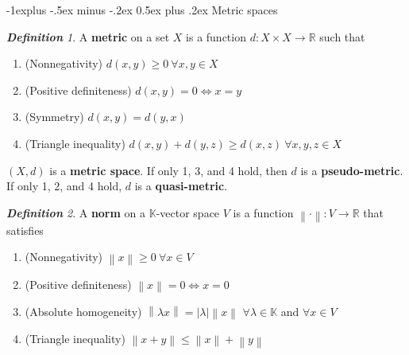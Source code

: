 \documentclass[frenchspacing,9pt,landscape,a4paper]{article}
\makeatletter
\renewcommand{\subsection}{\@startsection{subsection}{2}{0mm}%
                                {-1explus -.5ex minus -.2ex}%
                                {0.5ex plus .2ex}%
                                {\normalfont\normalsize\bfseries}}
\newcommand{\BR}{\mathbb R}
\newcommand{\abs}[1]{\left\lvert #1 \right\rvert}
\newcommand{\norm}[1]{\left\lVert #1 \right\rVert}
\theoremstyle{remark}
\newtheorem*{defn}{\textbf{Definition}}
\makeatother
\begin{document}
\begin{multicols}{4}
\subsection{Metric spaces}
\begin{defn}
    A \textbf{metric} on a set $X$ is a function  $d:X\times X\to\BR$ such that
     \begin{enumerate}
         \item (Nonnegativity) $d(x,y)\geq 0\ \forall x,y\in X$
         \item (Positive definiteness)  $d(x,y)=0\iff x=y$
         \item (Symmetry)  $d(x,y)=d(y,x)$
         \item (Triangle inequality)  $d(x,y)+d(y,z)\geq d(x,z)\ \forall x,y,z\in X$
     \end{enumerate} $(X,d)$ is a \textbf{metric space}. If only 1, 3, and 4 hold, then $d$ is a
     \textbf{pseudo-metric}. If only 1, 2, and 4 hold,  $d$ is a \textbf{quasi-metric}.
\end{defn}
\begin{defn}
    A \textbf{norm} on a $\mathbb{K}$-vector space  $V$ is a function  $\norm{\cdot}:V\to\BR$ that
    satisfies
     \begin{enumerate}
         \item (Nonnegativity) $\norm{x}\geq 0\ \forall x\in V$ 
         \item (Positive definiteness) $\norm{x}=0\iff x=0$
         \item  (Absolute homogeneity) $\norm{\lambda x}=\abs{\lambda}\norm{x}$
             $\forall\lambda\in\mathbb{K}$ and $\forall x\in V$ 
         \item (Triangle inequality)  $\norm{x+y}\leq\norm{x}+\norm{y}$
    \end{enumerate}
\end{defn}

\end{multicols}
\end{document}
